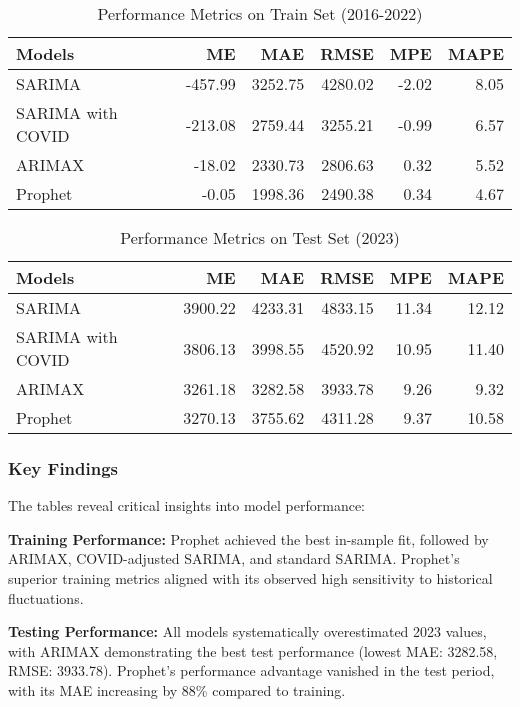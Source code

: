 \documentclass[10pt]{article}
\begin{document}
\begin{table}[ht]
\centering
\begin{tabular}{lrrrrr}
    \hline
    Models & ME & MAE & RMSE & MPE & MAPE \\ 
    \hline
    SARIMA & -457.99 & 3252.75 & 4280.02 & -2.02 & 8.05 \\ 
    SARIMA with COVID & -213.08 & 2759.44 & 3255.21 & -0.99 & 6.57 \\ 
    ARIMAX & -18.02 & 2330.73 & 2806.63 & 0.32 & 5.52 \\ 
    Prophet & -0.05 & 1998.36 & 2490.38 & 0.34 & 4.67 \\ 
    \hline
\end{tabular}
\caption{Performance Metrics on Train Set (2016-2022)}
\label{train_metrics}
\end{table}

\begin{table}[ht]
\centering
\begin{tabular}{lrrrrr}
    \hline
    Models & ME & MAE & RMSE & MPE & MAPE \\ 
    \hline
    SARIMA & 3900.22 & 4233.31 & 4833.15 & 11.34 & 12.12 \\ 
    SARIMA with COVID & 3806.13 & 3998.55 & 4520.92 & 10.95 & 11.40 \\ 
    ARIMAX & 3261.18 & 3282.58 & 3933.78 & 9.26 & 9.32 \\ 
    Prophet & 3270.13 & 3755.62 & 4311.28 & 9.37 & 10.58 \\ 
    \hline
\end{tabular}
\caption{Performance Metrics on Test Set (2023)}
\label{test_metrics}
\end{table}

\subsubsection{Key Findings}
The tables reveal critical insights into model performance:

\textbf{Training Performance:} Prophet achieved the best in-sample fit, followed by ARIMAX, COVID-adjusted SARIMA, and standard SARIMA. Prophet's superior training metrics aligned with its observed high sensitivity to historical fluctuations.

\textbf{Testing Performance:} All models systematically overestimated 2023 values, with ARIMAX demonstrating the best test performance (lowest MAE: 3282.58, RMSE: 3933.78). Prophet's performance advantage vanished in the test period, with its MAE increasing by 88\% compared to training.
\end{document}
